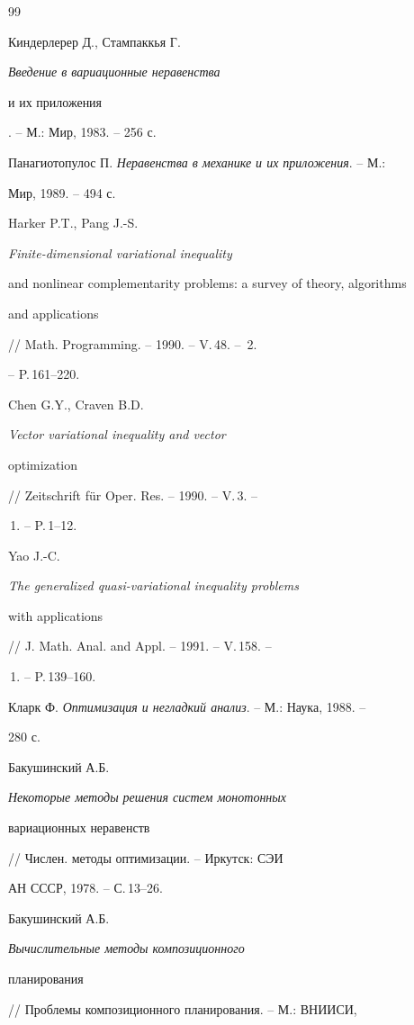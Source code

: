 \begin{thebibliography}{99}







Киндерлерер Д., Стампаккья Г. {\em Введение в вариационные неравенства


и их приложения}. -- М.: Мир, 1983. -- 256 с.




Панагиотопулос П. {\em Неравенства в механике и их приложения}. -- М.:


Мир, 1989. -- 494 с.




Harker P.T., Pang J.-S. {\em Finite-dimensional variational inequality


and nonlinear complementarity problems: a survey of theory, algorithms


and applications} // Math. Programming. -- 1990. -- V.\,48. -- \No\,2.


-- P.\,161--220.




Chen G.Y., Craven B.D. {\em Vector variational inequality and vector


optimization} // Zeitschrift f\"ur Oper. Res. -- 1990. -- V.\,3. --


\No\,1. -- P.\,1--12.




Yao J.-C. {\em The generalized quasi-variational inequality problems


with applications} // J. Math. Anal. and Appl. -- 1991. -- V.\,158. --


\No\,1. -- P.\,139--160.




Кларк Ф. {\em Оптимизация и негладкий анализ}. -- М.: Наука, 1988. --


280 с.




Бакушинский А.Б. {\em Некоторые методы решения систем монотонных


вариационных неравенств} // Числен. методы оптимизации. -- Иркутск: СЭИ


АН СССР, 1978. -- С.\,13--26.




Бакушинский А.Б. {\em Вычислительные методы композиционного


планирования} // Проблемы композиционного планирования. -- М.: ВНИИСИ,



\end{thebibliography}
